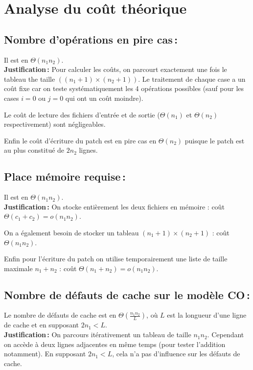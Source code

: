 \documentclass[a4paper, 10pt, french]{article}
\begin{document}
\section{Analyse du coût théorique}

  \subsection{Nombre  d'opérations en pire cas\,: }
    Il est en $\Theta(n_1 n_2)$.\\

    \textbf{Justification\,:} Pour calculer les coûts, on parcourt exactement une fois le tableau the taille $((n_1 +1)\times(n_2 +1))$.
    Le traitement de chaque case a un coût fixe car on teste systématiquement les 4 opérations possibles (sauf pour les cases $i=0$ ou $j=0$ qui ont un coût moindre).

    Le coût de lecture des fichiers d'entrée et de sortie ($\Theta(n_1)$ et $\Theta(n_2)$ respectivement) sont négligeables.

    Enfin le coût d'écriture du patch est en pire cas en $\Theta(n_2)$ puisque le patch est au plus constitué de $2n_2$ lignes.

  \subsection{Place mémoire requise\,: }
    Il est en $\Theta(n_1 n_2)$.\\

    \textbf{Justification\,:} On stocke entièrement les deux fichiers en mémoire : coût $\Theta(c_1 + c_2) = o(n_1n_2)$.

    On a également besoin de stocker un tableau $(n_1+1)\times(n_2+1)$ : coût $\Theta(n_1n_2)$.

    Enfin pour l'écriture du patch on utilise temporairement une liste de taille maximale $n_1 + n_2$ : coût $\Theta(n_1 + n_2) = o(n_1n_2)$.

  \subsection{Nombre de défauts de cache sur le modèle CO\,: }
  	Le nombre de défauts de cache est en $\Theta \left (\frac{n_1n_2}{L} \right )$, où $L$ est la longueur d'une ligne de cache et en supposant $2n_1 < L$.\\
  	
     \textbf{Justification\,:} On parcours itérativement un tableau de taille $n_1n_2$. Cependant on accède à deux lignes adjacentes en même temps (pour tester l'addition notamment). En supposant $2n_1 < L$, cela n'a pas d'influence sur les défauts de cache.
\end{document}
